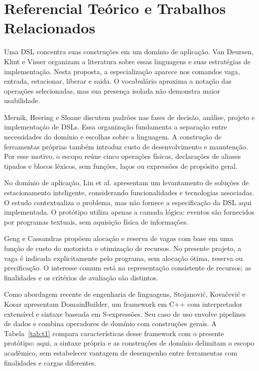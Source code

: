 \documentclass[conference,a4paper]{IEEEtran}
\begin{document}
\section{Referencial Teórico e Trabalhos Relacionados}

Uma DSL concentra suas construções em um domínio de aplicação. Van Deursen, Klint e Visser \cite{deursen2000} organizam a literatura sobre essas linguagens e suas estratégias de implementação. Nesta proposta, a especialização aparece nos comandos vaga, entrada, estacionar, liberar e saida. O vocabulário aproxima a notação das operações selecionadas, mas sua presença isolada não demonstra maior usabilidade.


Mernik, Heering e Sloane \cite{mernik2005} discutem padrões nas fases de decisão, análise, projeto e implementação de DSLs. Essa organização fundamenta a separação entre necessidades do domínio e escolhas sobre a linguagem. A construção de ferramentas próprias também introduz custo de desenvolvimento e manutenção. Por esse motivo, o escopo reúne cinco operações físicas, declarações de aliases tipados e blocos léxicos, sem funções, laços ou expressões de propósito geral.


No domínio de aplicação, Lin et al. \cite{lin2017} apresentam um levantamento de soluções de estacionamento inteligente, considerando funcionalidades e tecnologias associadas. O estudo contextualiza o problema, mas não fornece a especificação da DSL aqui implementada. O protótipo utiliza apenas a camada lógica: eventos são fornecidos por programas textuais, sem aquisição física de informações.


Geng e Cassandras \cite{geng2013} propõem alocação e reserva de vagas com base em uma função de custo do motorista e otimização de recursos. No presente projeto, a vaga é indicada explicitamente pelo programa, sem alocação ótima, reserva ou precificação. O interesse comum está na representação consistente de recursos; as finalidades e os critérios de avaliação são distintos.


Como abordagem recente de engenharia de linguagens, Stojanovi\'{c}, Kova\v{c}evi\'{c} e Kosar \cite{domainbuilder2026} apresentam DomainBuilder, um framework em C++ com interpretador extensível e sintaxe baseada em S-expressões. Seu caso de uso envolve pipelines de dados e combina operadores de domínio com construções gerais. A Tabela~\ref{tab:t1} compara características desse framework com o presente protótipo: aqui, a sintaxe própria e as construções de domínio delimitam o escopo acadêmico, sem estabelecer vantagem de desempenho entre ferramentas com finalidades e cargas diferentes.
\end{document}
